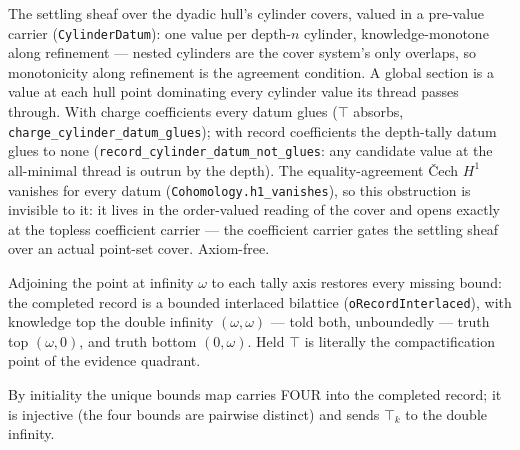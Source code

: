 \begin{theorem}\label{thm:record-settling-h1}\leanok{}
The settling sheaf over the dyadic hull's cylinder covers, valued in a
pre-value carrier (\texttt{CylinderDatum}): one value per depth-$n$
cylinder, knowledge-monotone along refinement --- nested cylinders are the
cover system's only overlaps, so monotonicity along refinement is the
agreement condition. A global section is a value at each hull point
dominating every cylinder value its thread passes through. With charge
coefficients every datum glues ($\top$ absorbs,
\texttt{charge\_cylinder\_datum\_glues}); with record coefficients the
depth-tally datum glues to none
(\texttt{record\_cylinder\_datum\_not\_glues}: any candidate value at the
all-minimal thread is outrun by the depth). The equality-agreement \v{C}ech
$H^1$ vanishes for every datum (\texttt{Cohomology.h1\_vanishes}), so this
obstruction is invisible to it: it lives in the order-valued reading of
the cover and opens exactly at the topless coefficient carrier --- the
coefficient carrier gates the settling sheaf over an actual point-set
cover. Axiom-free.
\end{theorem}

\begin{theorem}\label{thm:completed-record}\leanok{}
Adjoining the point at infinity $\omega$ to each tally axis restores every
missing bound: the completed record is a bounded interlaced bilattice
(\texttt{oRecordInterlaced}), with knowledge top the double infinity
$(\omega, \omega)$ --- told both, unboundedly --- truth top $(\omega, 0)$,
and truth bottom $(0, \omega)$. Held $\top$ is literally the
compactification point of the evidence quadrant.
\end{theorem}

\begin{theorem}\label{thm:four-embeds-completed-record}\leanok{}
By initiality the unique bounds map carries FOUR into the completed record;
it is injective (the four bounds are pairwise distinct) and sends $\top_k$ to
the double infinity.
\end{theorem}

